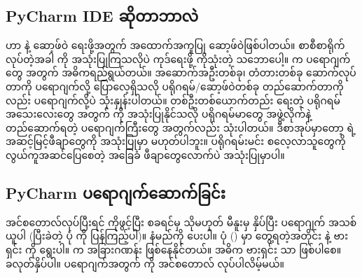 \subsection*{PyCharm IDE ဆိုတာဘာလဲ}
 ဟာ  နဲ့ ဆော့ဖ်ဝဲ  ရေးဖို့အတွက် အထောက်အကူပြု  ဆော့ဖ်ဝဲဖြစ်ပါတယ်။ စာစီစာရိုက်လုပ်တဲ့အခါ  ကို အသုံးပြုကြသလိုပဲ  ကုဒ်ရေးဖို့  ကိုသုံးတဲ့ သဘောပေါ့။  က  ပရောဂျက်တွေ အတွက် အဓိကရည်ရွယ်တယ်။ အဆောက်အဦးတစ်ခု၊ တံတားတစ်ခု ဆောက်လုပ်တာကို ပရောဂျက်လို့ ပြောလေ့ရှိသလို ပရိုဂရမ်/ဆော့ဖ်ဝဲတစ်ခု တည်ဆောက်တာကိုလည်း ပရောဂျက်လို့ပဲ သုံးနှုန်းပါတယ်။ တစ်ဦးတစ်ယောက်တည်း ရေးတဲ့ ပရိုဂရမ်အသေးလေးတွေ အတွက်  ကို အသုံးပြုနိုင်သလို ပရိုဂရမ်မာတွေ အဖွဲ့လိုက်နဲ့ တည်ဆောက်ရတဲ့ ပရောဂျက်ကြီးတွေ အတွက်လည်း သုံးပါတယ်။ ဒီစာအုပ်မှာတော့  ရဲ့ အဆင့်မြင့်ဖီချာတွေကို အသုံးပြုမှာ မဟုတ်ပါဘူး။ ပရိုဂရမ်းမင်း စလေ့လာသူတွေကို လွယ်ကူအဆင်ပြေစေတဲ့ အခြေခံ ဖီချာတွေလောက်ပဲ အသုံးပြုမှာပါ။ 

\clearpage





\subsection*{PyCharm ပရောဂျက်ဆောက်ခြင်း}
အင်စတောလ်လုပ်ပြီးရင်  ကိုဖွင့်ပြီး  စခရင်မှ သိုမဟုတ်  မီနူးမှ  နှိပ်ပြီး ပရောဂျက် အသစ်ယူပါ (ပြီးခဲတဲ့ ပုံ \fRefNo{\ref{fig:pychmwlcm}} ကို ပြန်ကြည့်ပါ)။ နံမည်ကို  ပေးပါ။ ပုံ (\fRefNo{\ref{fig:new_proj}}) မှာ တွေ့ရတဲ့အတိုင်း  နဲ့  ဗားရှင်း  ကို ရွေးပါ။  က အခြားဂဏန်း ဖြစ်နေနိုင်တယ်။ အဓိက ဗားရှင်း  သာ ဖြစ်ပါစေ။  ခလုတ်နှိပ်ပါ။ ပရောဂျက်အတွက်  ကို အင်စတောလ် လုပ်ပါလိမ့်မယ်။

